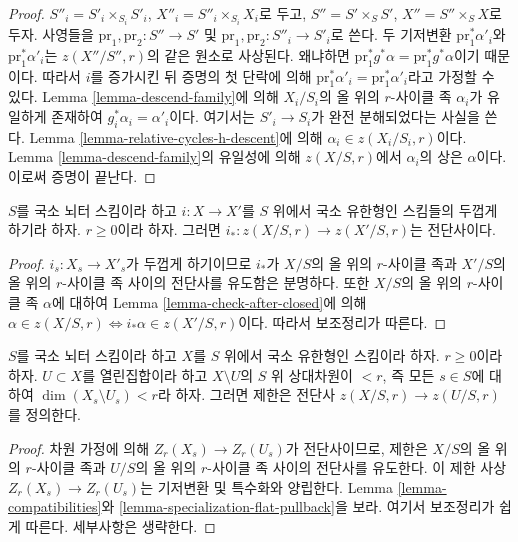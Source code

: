 \begin{proof}
\medskip\noindent
$S''_i = S'_i \times_{S_i} S'_i$, $X''_i = S''_i \times_{S_i} X_i$로
두고, $S'' = S' \times_S S'$, $X'' = S'' \times_S X$로 두자.
사영들을 $\text{pr}_1, \text{pr}_2 : S'' \to S'$ 및
$\text{pr}_1, \text{pr}_2 : S''_i \to S'_i$로 쓴다.
두 기저변환 $\text{pr}_1^*\alpha'_i$와
$\text{pr}_1^*\alpha'_i$는 $z(X''/S'', r)$의 같은 원소로 사상된다.
왜냐하면 $\text{pr}_1^*g^*\alpha = \text{pr}_1^*g^*\alpha$이기 때문이다.
따라서 $i$를 증가시킨 뒤 증명의 첫 단락에 의해
$\text{pr}_1^*\alpha'_i = \text{pr}_1^*\alpha'_i$라고 가정할 수 있다.
Lemma \ref{lemma-descend-family}에 의해 $X_i/S_i$의 올 위의
$r$-사이클 족 $\alpha_i$가 유일하게 존재하여
$g_i^*\alpha_i = \alpha'_i$이다.
여기서는 $S'_i \to S_i$가 완전 분해되었다는 사실을 쓴다.
Lemma \ref{lemma-relative-cycles-h-descent}에 의해
$\alpha_i \in z(X_i/S_i, r)$이다. Lemma \ref{lemma-descend-family}의
유일성에 의해 $z(X/S, r)$에서 $\alpha_i$의 상은 $\alpha$이다.
이로써 증명이 끝난다.
\end{proof}

\begin{lemma}
\label{lemma-thickening}
$S$를 국소 뇌터 스킴이라 하고 $i : X \to X'$를 $S$ 위에서
국소 유한형인 스킴들의 두껍게 하기라 하자. $r \geq 0$이라 하자.
그러면 $i_* : z(X/S, r) \to z(X'/S, r)$는 전단사이다.
\end{lemma}

\begin{proof}
$i_s : X_s \to X'_s$가 두껍게 하기이므로 $i_*$가 $X/S$의 올 위의
$r$-사이클 족과 $X'/S$의 올 위의 $r$-사이클 족 사이의 전단사를
유도함은 분명하다. 또한 $X/S$의 올 위의 $r$-사이클 족 $\alpha$에
대하여 Lemma \ref{lemma-check-after-closed}에 의해
$\alpha \in z(X/S, r) \Leftrightarrow i_*\alpha \in z(X'/S, r)$이다.
따라서 보조정리가 따른다.
\end{proof}

\begin{lemma}
\label{lemma-extend-to-larger}
$S$를 국소 뇌터 스킴이라 하고 $X$를 $S$ 위에서 국소 유한형인
스킴이라 하자. $r \geq 0$이라 하자. $U \subset X$를 열린집합이라
하고 $X \setminus U$의 $S$ 위 상대차원이 $< r$, 즉 모든
$s \in S$에 대하여 $\dim(X_s \setminus U_s) < r$라 하자. 그러면
제한은 전단사 $z(X/S, r) \to z(U/S, r)$를 정의한다.
\end{lemma}

\begin{proof}
차원 가정에 의해 $Z_r(X_s) \to Z_r(U_s)$가 전단사이므로, 제한은
$X/S$의 올 위의 $r$-사이클 족과 $U/S$의 올 위의 $r$-사이클 족
사이의 전단사를 유도한다. 이 제한 사상 $Z_r(X_s) \to Z_r(U_s)$는
기저변환 및 특수화와 양립한다. Lemma \ref{lemma-compatibilities}와
\ref{lemma-specialization-flat-pullback}을 보라. 여기서 보조정리가
쉽게 따른다. 세부사항은 생략한다.
\end{proof}

